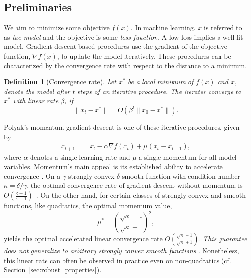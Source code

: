 \documentclass{article}
\newtheorem{definition}[theorem]{Definition}
\begin{document}


\subsection{Preliminaries}
\label{sec:robust_preliminaries}
We aim to minimize some objective $f(x)$.
In machine learning, $x$ is referred to as {\em the model} and the objective is some {\em loss function}.
A low loss implies a well-fit model.
Gradient descent-based procedures use the gradient of the objective function, $\nabla f(x)$, to update the model iteratively.
These procedures can be characterized by the convergence rate with respect to the distance to a minimum.
\begin{definition} [Convergence rate]
	Let $x^*$ be a local minimum of $f(x)$ and $x_t$ denote the model after $t$ steps of an iterative procedure. %
The iterates converge to $x^*$ with linear rate $\beta$,
	if \[ \| x_{t} - x^* \| = O(\beta^t \| x_0 - x^* \|).\]
\end{definition}
Polyak's momentum gradient descent \citep{polyak1964some} is one of these iterative procedures, given by
\begin{align}
	x_{t+1}  &= x_t - \alpha \nabla f(x_t) + \mu (x_t - x_{t-1}),
	\label{eqn:momentum_gd}
\end{align} 
where $\alpha$ denotes a single learning rate and $\mu$ a single momentum for all model variables.   
Momentum's main appeal is its established ability to {accelerate convergence} \citep{polyak1964some}. 
On a $\gamma$-strongly convex $\delta$-smooth function with condition number $\kappa=\delta/\gamma$, the optimal convergence rate of gradient descent without momentum
is $O(\frac{\kappa-1}{\kappa+1})$~\citep{nesterov2013introductory}.
On the other hand, for certain classes of strongly convex and smooth functions, like quadratics,
 the optimal momentum value,
\vspace{-0.5em}
\begin{equation}
	\mu^* = \left(\frac{\sqrt{\kappa}-1}{\sqrt{\kappa}+1}\right)^2,
	\label{eqn:optimal_momentum}
\end{equation}
yields the optimal accelerated linear convergence rate $O(\frac{\sqrt{\kappa}-1}{\sqrt{\kappa}+1})$.
{\em This guarantee does not generalize to arbitrary strongly convex smooth functions} \citep{lessard2016analysis}.
Nonetheless, this linear rate can often be observed in practice even on non-quadratics (cf. Section~\ref{sec:robust_properties}).
\end{document}
